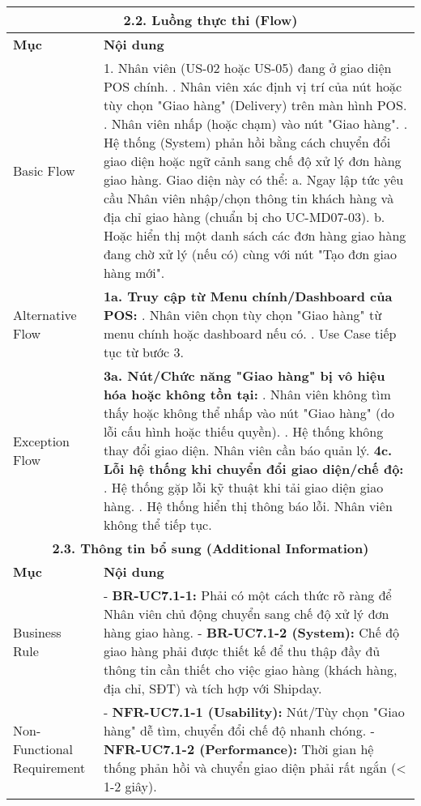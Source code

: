 \begin{longtable}{|m{4cm}|p{11cm}|}
\hline
\multicolumn{2}{|c|}{\textbf{2.2. Luồng thực thi (Flow)}} \\
\hline
\textbf{Mục} & \textbf{Nội dung} \\
\hline
Basic Flow & 1. Nhân viên (US-02 hoặc US-05) đang ở giao diện POS chính. \newline 2. Nhân viên xác định vị trí của nút hoặc tùy chọn "Giao hàng" (Delivery) trên màn hình POS. \newline 3. Nhân viên nhấp (hoặc chạm) vào nút "Giao hàng". \newline 4. Hệ thống (System) phản hồi bằng cách chuyển đổi giao diện hoặc ngữ cảnh sang chế độ xử lý đơn hàng giao hàng. Giao diện này có thể: \newline    a. Ngay lập tức yêu cầu Nhân viên nhập/chọn thông tin khách hàng và địa chỉ giao hàng (chuẩn bị cho UC-MD07-03). \newline    b. Hoặc hiển thị một danh sách các đơn hàng giao hàng đang chờ xử lý (nếu có) cùng với nút "Tạo đơn giao hàng mới". \\
\hline
Alternative Flow & \textbf{1a. Truy cập từ Menu chính/Dashboard của POS:} \newline    1. Nhân viên chọn tùy chọn "Giao hàng" từ menu chính hoặc dashboard nếu có. \newline    2. Use Case tiếp tục từ bước 3. \\
\hline
Exception Flow & \textbf{3a. Nút/Chức năng "Giao hàng" bị vô hiệu hóa hoặc không tồn tại:} \newline    1. Nhân viên không tìm thấy hoặc không thể nhấp vào nút "Giao hàng" (do lỗi cấu hình hoặc thiếu quyền). \newline    2. Hệ thống không thay đổi giao diện. Nhân viên cần báo quản lý. \newline \textbf{4c. Lỗi hệ thống khi chuyển đổi giao diện/chế độ:} \newline    1. Hệ thống gặp lỗi kỹ thuật khi tải giao diện giao hàng. \newline    2. Hệ thống hiển thị thông báo lỗi. Nhân viên không thể tiếp tục. \\
\hline
\multicolumn{2}{|c|}{\textbf{2.3. Thông tin bổ sung (Additional Information)}} \\
\hline
\textbf{Mục} & \textbf{Nội dung} \\
\hline
Business Rule & - \textbf{BR-UC7.1-1:} Phải có một cách thức rõ ràng để Nhân viên chủ động chuyển sang chế độ xử lý đơn hàng giao hàng. \newline - \textbf{BR-UC7.1-2 (System):} Chế độ giao hàng phải được thiết kế để thu thập đầy đủ thông tin cần thiết cho việc giao hàng (khách hàng, địa chỉ, SĐT) và tích hợp với Shipday. \\
\hline
Non-Functional Requirement & - \textbf{NFR-UC7.1-1 (Usability):} Nút/Tùy chọn "Giao hàng" dễ tìm, chuyển đổi chế độ nhanh chóng. \newline - \textbf{NFR-UC7.1-2 (Performance):} Thời gian hệ thống phản hồi và chuyển giao diện phải rất ngắn (< 1-2 giây). \\
\hline
\end{longtable}

